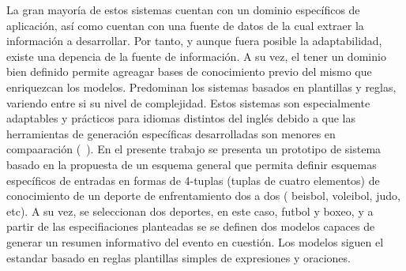     La gran mayoría de estos sistemas cuentan con un dominio específicos de aplicación, así como cuentan con una fuente de datos de la 
cual extraer la información a desarrollar. Por tanto, y aunque fuera posible la adaptabilidad, existe una depencia de la fuente de información. A su vez, el tener un dominio bien definido  
permite agreagar bases de conocimiento previo del mismo que enriquezcan los modelos. Predominan los sistemas basados en plantillas y reglas, variendo entre si su nivel de complejidad. Estos 
sistemas son especialmente adaptables y prácticos para idiomas distintos del inglés debido a que las herramientas de generación específicas desarrolladas son menores en compaaración (~\cite{gunasiri2021automated}). 
    En el presente trabajo se presenta un prototipo de sistema basado en la propuesta de un esquema general que permita definir esquemas específicos de entradas en formas de 4-tuplas (tuplas de cuatro elementos) de 
conocimiento de un deporte de enfrentamiento dos a dos ( beisbol, voleibol, judo, etc). A su vez, se seleccionan dos deportes, en este caso, futbol y boxeo, y a partir de las especifiaciones planteadas se 
se definen dos modelos capaces de generar un resumen informativo del evento en cuestión. Los modelos siguen el estandar basado en reglas plantillas simples de expresiones y oraciones.






 


